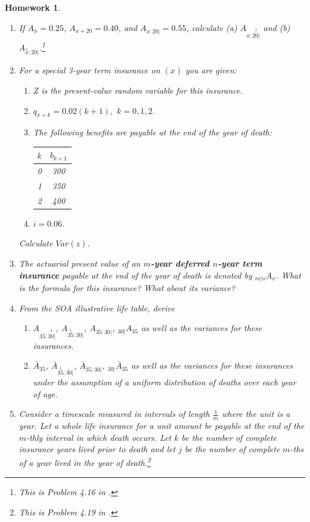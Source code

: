 \documentclass[11pt,fleqn,oneside]{book}
\newtheorem{homework}{Homework}
\begin{document}
\begin{homework}
\label{HW12}
\begin{enumerate}
\item If $A_x = 0.25$, $A_{x+20} = 0.40$, and $A_{x:\overline{20}|}=0.55$, calculate (a) $A_{x:\stackrel{1}{\overline{20}|}}$ and (b) $A_{\stackrel{1}{x}:\overline{20}|}$.\footnote{This is Problem 4.16 in \cite{BOWERS}.}  
\item For a special 3-year term insurance on $(x)$ you are given: 
\begin{enumerate}
\item Z is the present-value random variable for this insurance.
\item $q_{x+k} = 0.02(k+1),$ $k=0,1,2$.
\item The following benefits are payable at the end of the year of death:
\begin{center}
\begin{tabular}{|c|c|}
\hline
$k$ & $b_{k+1}$ \\
\hline
0 & 300 \\
1 & 350 \\
2 & 400 \\
\hline
\end{tabular}
\end{center}
\item $i=0.06$.
\end{enumerate}
Calculate $Var(z)$.
\item The actuarial present value of an \textbf{$m$-year deferred $n$-year term insurance} payable at the end of the year of death is denoted by  ${_{m|n}A_x}$. What is the formula for this insurance? What about its variance? 
\item \label{HW12a} From the SOA illustrative life table, derive
\begin{enumerate}
\item ${A_{35:\stackrel{1}{\overline{30}|}}}$,
${A_{\stackrel{1}{35}:\overline{30}|}}$,
${A_{35:\overline{30}|}}$, 
${_{30|}A_{35}}$ as well as the variances for these insurances.
\item ${\bar{A}_{35}}$,
${\bar{A}_{\stackrel{1}{35}:\overline{30}|}}$, 
${\bar{A}_{35:\overline{30}|}}$, 
${_{30|}\bar{A}_{35}}$ as well as the variances for these insurances under the assumption of a uniform distribution of deaths over each year of age.
\end{enumerate}
\item \label{MTHLYINS} Consider a timescale measured in intervals of length $\frac{1}{m}$ where the unit is a year. Let a whole life insurance for a unit amount be payable at the end of the $m$-thly interval in which death occurs. Let $k$ be the number of complete insurance years lived prior to death and let $j$ be the number of complete $m$-ths of a year lived in the year of death.\footnote{This is Problem 4.19 in \cite{BOWERS}.}  

\end{enumerate}
\end{homework}
\end{document}
